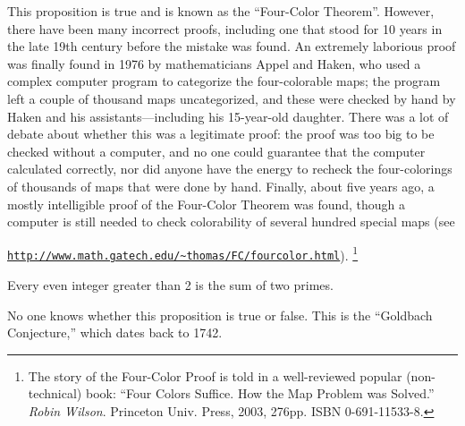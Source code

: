 This proposition is true and is known as the ``Four-Color Theorem''.
However, there have been many incorrect proofs, including one that stood
for 10 years in the late 19th century before the mistake was found.  An
extremely laborious proof was finally found in 1976 by mathematicians
Appel and Haken, who used a complex computer program to categorize the
four-colorable maps; the program left a couple of thousand maps
uncategorized, and these were checked by hand by Haken and his
assistants---including his 15-year-old daughter.  There was a lot of
debate about whether this was a legitimate proof: the proof was too big to
be checked without a computer, and no one could guarantee that the
computer calculated correctly, nor did anyone have the energy to recheck
the four-colorings of thousands of maps that were done by hand.  Finally,
about five years ago, a mostly intelligible proof of the Four-Color
Theorem was found, though a computer is still needed to check colorability
of several hundred special maps (see

\href{http://www.math.gatech.edu/~thomas/FC/fourcolor.html}
{\texttt{http://www.math.gatech.edu/\~{}thomas/FC/fourcolor.html}}).
\footnote{The story of the Four-Color Proof is told in a well-reviewed
  popular (non-technical) book: ``Four Colors Suffice.  How the Map
  Problem was Solved.'' \emph{Robin Wilson}.  Princeton Univ. Press, 2003,
  276pp. ISBN 0-691-11533-8.}

\begin{proposition}[Goldbach]
Every even integer greater than 2 is the sum of two primes.
\end{proposition}

No one knows whether this proposition is true or false.  This is the
``Goldbach Conjecture,'' which dates back to 1742.

\iffalse

For a Computer Scientist, some of the most important questions are about
program and system ``correctness'' -- whether a program or system does what
it's supposed to.  Programs are notoriously buggy, and there's a growing
community of researchers and practitioners trying to find ways to prove
program correctness.  These efforts have been successful enough in the case
of CPU chips that they are now routinely used by leading chip manufacturers
to prove chip correctness and avoid mistakes like the notorious Intel
division bug in the 1990's.

Developing mathematical methods to verify programs and systems remains an
active research area.  We'll consider some of these methods later in the
course.
\fi

\endinput
